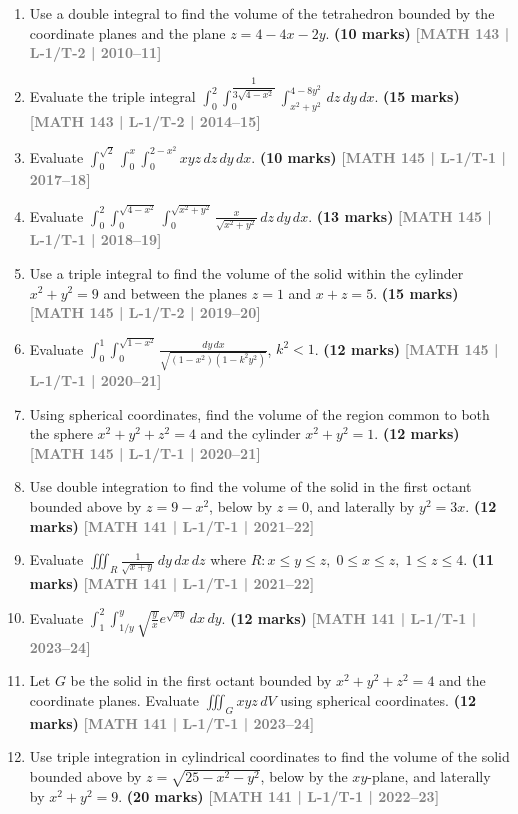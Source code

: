 \documentclass[12pt,a4paper]{article}
\newcommand{\yr}[1]{\hfill\textcolor{gray}{\small\textbf{[#1]}}}
\newcommand{\mk}[1]{\textcolor{orange!70!black}{\small\textbf{(#1 marks)}}}
\begin{document}
\begin{enumerate}

\item Use a double integral to find the volume of the tetrahedron bounded by the coordinate planes and the plane $z=4-4x-2y$.
\mk{10} \yr{MATH 143 | L-1/T-2 | 2010--11}

\item Evaluate the triple integral $\displaystyle\int_{0}^{2}\int_{0}^{\dfrac{1}{3\sqrt{4-x^{2}}}}\int_{x^{2}+y^{2}}^{4-8y^{2}}\,dz\,dy\,dx$.
\mk{15} \yr{MATH 143 | L-1/T-2 | 2014--15}

\item Evaluate $\displaystyle\int_{0}^{\sqrt{2}}\int_{0}^{x}\int_{0}^{2-x^{2}}xyz\,dz\,dy\,dx$.
\mk{10} \yr{MATH 145 | L-1/T-1 | 2017--18}

\item Evaluate $\displaystyle\int_{0}^{2}\int_{0}^{\sqrt{4-x^{2}}}\int_{0}^{\sqrt{x^{2}+y^{2}}}\frac{x}{\sqrt{x^{2}+y^{2}}}\,dz\,dy\,dx$.
\mk{13} \yr{MATH 145 | L-1/T-1 | 2018--19}

\item Use a triple integral to find the volume of the solid within the cylinder $x^{2}+y^{2}=9$ and between the planes $z=1$ and $x+z=5$.
\mk{15} \yr{MATH 145 | L-1/T-2 | 2019--20}

\item Evaluate $\displaystyle\int_{0}^{1}\int_{0}^{\sqrt{1-x^{2}}}\frac{dy\,dx}{\sqrt{(1-x^{2})(1-k^{2}y^{2})}}$, $k^{2}<1$.
\mk{12} \yr{MATH 145 | L-1/T-1 | 2020--21}

\item Using spherical coordinates, find the volume of the region common to both the sphere $x^{2}+y^{2}+z^{2}=4$ and the cylinder $x^{2}+y^{2}=1$.
\mk{12} \yr{MATH 145 | L-1/T-1 | 2020--21}

\item Use double integration to find the volume of the solid in the first octant bounded above by $z=9-x^{2}$, below by $z=0$, and laterally by $y^{2}=3x$.
\mk{12} \yr{MATH 141 | L-1/T-1 | 2021--22}

\item Evaluate $\displaystyle\iiint_{R}\frac{1}{\sqrt{x+y}}\,dy\,dx\,dz$ where $R: x\le y\le z,\;0\le x\le z,\;1\le z\le 4$.
\mk{11} \yr{MATH 141 | L-1/T-1 | 2021--22}

\item Evaluate $\displaystyle\int_{1}^{2}\int_{1/y}^{y}\sqrt{\frac{y}{x}}e^{\sqrt{xy}}\,dx\,dy$.
\mk{12} \yr{MATH 141 | L-1/T-1 | 2023--24}

\item Let $G$ be the solid in the first octant bounded by $x^{2}+y^{2}+z^{2}=4$ and the coordinate planes. Evaluate $\displaystyle\iiint_{G}xyz\,dV$ using spherical coordinates.
\mk{12} \yr{MATH 141 | L-1/T-1 | 2023--24}

\item Use triple integration in cylindrical coordinates to find the volume of the solid bounded above by $z=\sqrt{25-x^{2}-y^{2}}$, below by the $xy$-plane, and laterally by $x^{2}+y^{2}=9$.
\mk{20} \yr{MATH 141 | L-1/T-1 | 2022--23}

\end{enumerate}
\end{document}
